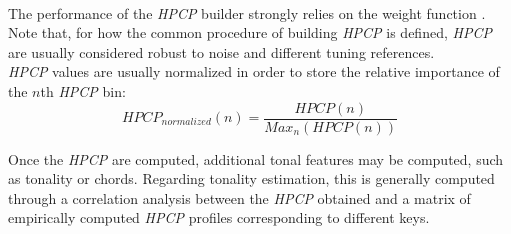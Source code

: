 \begin{itemize}
\\ The performance of the \textit{HPCP} builder strongly relies on the weight function \cite{cabral05}. Note that, for how the common procedure of building \textit{HPCP} is defined, \textit{HPCP} are usually considered robust to noise and different tuning references. \\
\textit{HPCP} values are usually normalized in order to store the relative importance of the $n$th \textit{HPCP} bin:
\begin{equation}
HPCP_{normalized}(n) = \frac{HPCP(n)}{Max_n(HPCP(n))}
\end{equation}
\end{itemize}

Once the \textit{HPCP} are computed, additional tonal features may be computed, such as tonality or chords. Regarding tonality estimation, this is generally computed through a correlation analysis between the \textit{HPCP} obtained and a matrix of empirically computed \textit{HPCP} profiles corresponding to different keys. 


